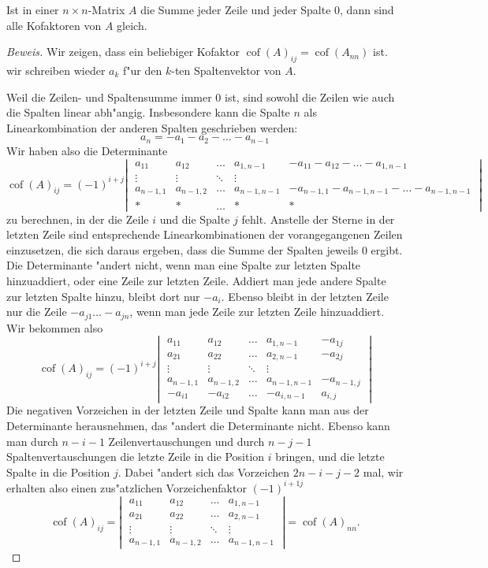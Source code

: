 \begin{hilfssatz}
Ist in einer $n\times n$-Matrix $A$ die Summe jeder Zeile und jeder
Spalte $0$, dann sind alle Kofaktoren von $A$ gleich.
\end{hilfssatz}
\begin{proof}[Beweis]
Wir zeigen, dass ein beliebiger Kofaktor
$\operatorname{cof}(A)_{ij}=\operatorname{cof}(A_{nn})$ ist.
wir schreiben wieder $a_k$ f"ur den $k$-ten Spaltenvektor von $A$.

Weil die Zeilen- und Spaltensumme immer $0$ ist, sind sowohl die
Zeilen wie auch die Spalten linear abh"angig. Insbesondere kann die Spalte
$n$ als Linearkombination der anderen Spalten geschrieben werden:
\[
a_n=-a_1-a_2-\dots-a_{n-1}
\]
Wir haben also die Determinante
\[
\operatorname{cof}(A)_{ij}
=
(-1)^{i+j}
\left|\;
\begin{matrix}
a_{11}&a_{12}&\dots &a_{1,n-1}&-a_{11}-a_{12}-\dots-a_{1,n-1}\\
\vdots&\vdots&\ddots&\vdots\\
a_{n-1,1}&a_{n-1,2}&\dots&a_{n-1,n-1}&-a_{n-1,1}-a_{n-1,n-1}-\dots-a_{n-1,n-1}\\
*&*&\dots&*&*
\end{matrix}
\;\right|
\]
zu berechnen, in der die Zeile $i$ und die Spalte $j$ fehlt. Anstelle
der Sterne in der letzten Zeile sind entsprechende Linearkombinationen
der vorangegangenen Zeilen einzusetzen, die sich daraus ergeben,
dass die Summe der Spalten jeweils $0$ ergibt.
Die Determinante "andert nicht, wenn man eine Spalte zur letzten Spalte
hinzuaddiert, oder eine Zeile zur letzten Zeile. Addiert man jede
andere Spalte zur letzten Spalte hinzu, bleibt dort nur $-a_i$.
Ebenso bleibt in der letzten Zeile nur die Zeile $-a_{j1}\dots-a_{jn}$,
wenn man jede Zeile zur letzten Zeile hinzuaddiert. Wir bekommen also
\[
\operatorname{cof}(A)_{ij}
=
(-1)^{i+j}
\left|\;
\begin{matrix}
a_{11}&a_{12}&\dots &a_{1,n-1}&-a_{1j}\\
a_{21}&a_{22}&\dots &a_{2,n-1}&-a_{2j}\\
\vdots&\vdots&\ddots&\vdots\\
a_{n-1,1}&a_{n-1,2}&\dots&a_{n-1,n-1}&-a_{n-1,j}\\
-a_{i1}&-a_{i2}&\dots&-a_{i,n-1}&a_{i,j}
\end{matrix}
\;\right|
\]
Die negativen Vorzeichen in der letzten Zeile und Spalte kann man aus
der Determinante herausnehmen, das "andert die Determinante nicht.
Ebenso kann man durch $n-i-1$ Zeilenvertauschungen und durch
$n-j-1$ Spaltenvertauschungen die letzte Zeile in die
Position $i$ bringen, und die letzte Spalte in die Position $j$.
Dabei "andert sich das Vorzeichen $2n-i-j-2$ mal, wir erhalten also
einen zus"atzlichen Vorzeichenfaktor $(-1)^{i+1j}$
\[
\operatorname{cof}(A)_{ij}=
\left|\;
\begin{matrix}
a_{11}&a_{12}&\dots&a_{1,n-1}\\
a_{21}&a_{22}&\dots&a_{2,n-1}\\
\vdots&\vdots&\ddots&\vdots\\
a_{n-1,1}&a_{n-1,2}&\dots&a_{n-1,n-1}
\end{matrix}
\;\right|
=\operatorname{cof}(A)_{nn}.
\]
\end{proof}
